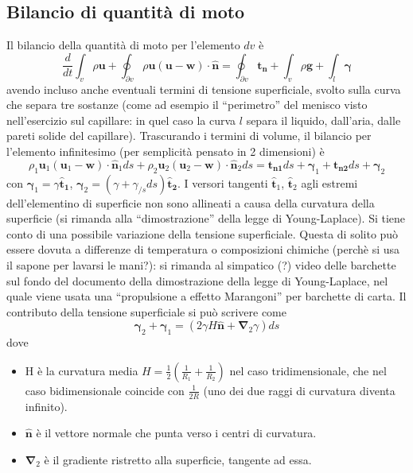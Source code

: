 \subsection{Bilancio di quantità di moto}
Il bilancio della quantità di moto per l'elemento $dv$ è
\begin{equation}
 \dfrac{d}{dt}\int_{v} \rho\bm{u} + \oint_{\partial v} \rho \bm{u}(\bm{u} - \bm{w} ) \cdot \bm{\hat{n}} = \oint_{\partial v} \bm{t_n} + \int_{v} \rho \bm{g} + \int_{l} \bm{\gamma}
\end{equation}
avendo incluso anche eventuali termini di tensione superficiale, svolto 
 sulla curva che separa tre sostanze (come ad esempio il ``perimetro''
 del menisco visto nell'esercizio sul capillare: in quel caso la curva
 $l$ separa il liquido, dall'aria, dalle pareti solide del capillare).
Trascurando i termini di volume, il bilancio per l'elemento infinitesimo (per semplicità pensato in 2 dimensioni) è
\begin{equation}
 \rho_1 \bm{u}_1 (\bm{u}_1 - \bm{w})\cdot \bm{\hat{n}}_1 ds + \rho_2 \bm{u}_2 (\bm{u}_2 -\bm{w}) \cdot \bm{\hat{n}}_2 ds =
    \bm{t_{n1}} ds + \bm{\gamma}_1  + \bm{t_{n2}} ds + \bm{\gamma}_2 
\end{equation}
con $\bm{\gamma}_1 = \gamma \bm{\hat{t}_1}$, $\bm{\gamma}_2 = (\gamma + \gamma_{/s} ds) \bm{\hat{t}_2}$. I versori 
 tangenti $\bm{\hat{t}}_1$, $\bm{\hat{t}}_2$ agli estremi dell'elementino di superficie non sono allineati a causa della curvatura della superficie (si
rimanda alla ``dimostrazione'' della legge di Young-Laplace). Si tiene conto di una possibile
 variazione della tensione superficiale. Questa di solito può essere
 dovuta a differenze di temperatura o composizioni chimiche (perchè si
usa il sapone per lavarsi le mani?): si rimanda al 
 simpatico (?) video delle barchette sul fondo del documento della dimostrazione
 della legge di Young-Laplace, nel quale viene usata una ``propulsione a effetto Marangoni'' per barchette di carta. Il contributo della tensione superficiale si può scrivere come
\begin{equation}
 \bm{\gamma}_2 + \bm{\gamma}_1 = (2 \gamma H \bm{\hat{n}} + \bm{\nabla}_2 \gamma )ds
\end{equation}
dove
\begin{itemize}
 \item H è la curvatura media $H = \frac{1}{2}\left(\frac{1}{R_1} + \frac{1}{R_2}\right)$ nel caso tridimensionale, che nel caso bidimensionale
 coincide con $ \frac{1}{2 R}$ (uno dei due raggi di curvatura diventa infinito).
 \item $\bm{\hat{n}}$ è il vettore normale che punta verso i centri di
 curvatura.
 \item $\bm{\nabla}_2$ è il gradiente ristretto alla superficie, tangente ad essa.
\end{itemize}

